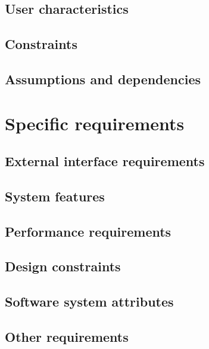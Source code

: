 \documentclass[12pt]{report}
\begin{document}
\section{User characteristics}


\section{Constraints}


\section{Assumptions and dependencies}


\chapter{Specific requirements}
\label{ch:requirements}

\section{External interface requirements}


\section{System features}


\section{Performance requirements}


\section{Design constraints}


\section{Software system attributes}


\section{Other requirements}

\end{document}

